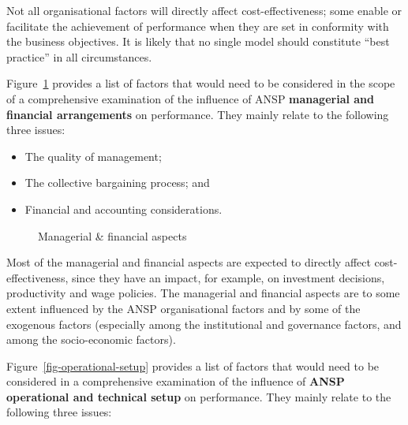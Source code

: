 \documentclass[
  11pt,
  a4paperpaper,
  openany,headsepline=on,footsepline=off,DIV=12,table]{scrbook}
\providecommand{\tightlist}{%
  \setlength{\itemsep}{0pt}\setlength{\parskip}{0pt}}\usepackage{longtable,booktabs,array}
\begin{document}
Not all organisational factors will directly affect cost-effectiveness;
some enable or facilitate the achievement of performance when they are
set in conformity with the business objectives. It is likely that no
single model should constitute ``best practice'' in all circumstances.

Figure~\ref{fig-managerial} provides a list of factors that would need
to be considered in the scope of a comprehensive examination of the
influence of ANSP \textbf{managerial and financial arrangements} on
performance. They mainly relate to the following three issues:

\begin{itemize}
\tightlist
\item
  The quality of management;
\item
  The collective bargaining process; and
\item
  Financial and accounting considerations.
\end{itemize}

\begin{figure}[H]


\caption{\label{fig-managerial}Managerial \& financial aspects}

\end{figure}%

Most of the managerial and financial aspects are expected to directly
affect cost-effectiveness, since they have an impact, for example, on
investment decisions, productivity and wage policies. The managerial and
financial aspects are to some extent influenced by the ANSP
organisational factors and by some of the exogenous factors (especially
among the institutional and governance factors, and among the
socio-economic factors).

Figure~\ref{fig-operational-setup} provides a list of factors that would
need to be considered in a comprehensive examination of the influence of
\textbf{ANSP operational and technical setup} on performance. They
mainly relate to the following three issues:
\end{document}
